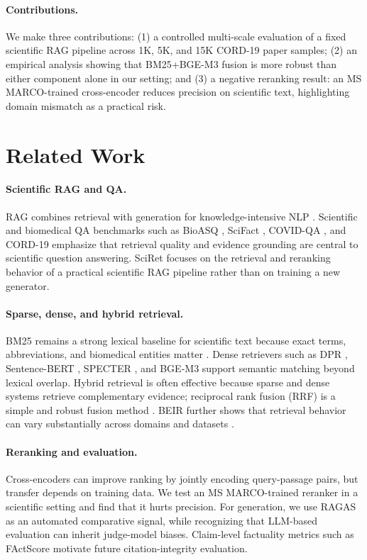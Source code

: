 \documentclass[11pt]{article}
\begin{document}
\paragraph{Contributions.}
We make three contributions:
(1) a controlled multi-scale evaluation of a fixed scientific RAG pipeline across 1K, 5K, and 15K CORD-19 paper samples;
(2) an empirical analysis showing that BM25+BGE-M3 fusion is more robust than either component alone in our setting; and
(3) a negative reranking result: an MS MARCO-trained cross-encoder reduces precision on scientific text, highlighting domain mismatch as a practical risk.

\section{Related Work}

\paragraph{Scientific RAG and QA.}
RAG combines retrieval with generation for knowledge-intensive NLP \citep{lewis2020rag}. Scientific and biomedical QA benchmarks such as BioASQ \citep{bioasq}, SciFact \citep{wadden2020scifact}, COVID-QA \citep{moller2020covidqa}, and CORD-19 \citep{wang2020cord19} emphasize that retrieval quality and evidence grounding are central to scientific question answering. SciRet focuses on the retrieval and reranking behavior of a practical scientific RAG pipeline rather than on training a new generator.

\paragraph{Sparse, dense, and hybrid retrieval.}
BM25 remains a strong lexical baseline for scientific text because exact terms, abbreviations, and biomedical entities matter \citep{robertson2009bm25}. Dense retrievers such as DPR \citep{karpukhin2020dpr}, Sentence-BERT \citep{reimers2019sbert}, SPECTER \citep{cohan2020specter}, and BGE-M3 \citep{chen2024bgem3} support semantic matching beyond lexical overlap. Hybrid retrieval is often effective because sparse and dense systems retrieve complementary evidence; reciprocal rank fusion (RRF) is a simple and robust fusion method \citep{cormack2009rrf}. BEIR further shows that retrieval behavior can vary substantially across domains and datasets \citep{thakur2021beir}.

\paragraph{Reranking and evaluation.}
Cross-encoders can improve ranking by jointly encoding query-passage pairs, but transfer depends on training data. We test an MS MARCO-trained reranker in a scientific setting and find that it hurts precision. For generation, we use RAGAS \citep{es2023ragas} as an automated comparative signal, while recognizing that LLM-based evaluation can inherit judge-model biases. Claim-level factuality metrics such as FActScore \citep{min2023factscore} motivate future citation-integrity evaluation.
\end{document}
